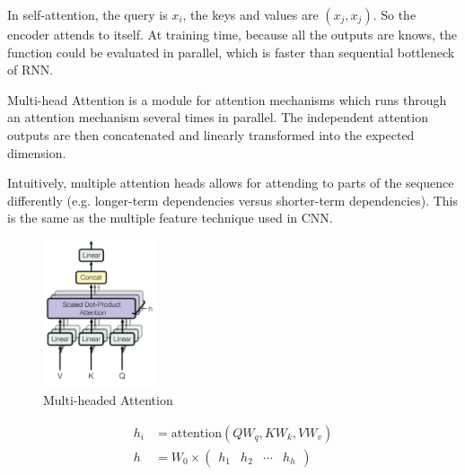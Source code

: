 \begin{definition}
    In self-attention, the query is $x_i$, the keys and values are $(x_j, x_j)$. So the encoder attends to itself. At training time, because all the outputs are knows, the function could be evaluated in parallel, which is faster than sequential bottleneck of RNN.
\end{definition}

\begin{definition}
    Multi-head Attention is a module for attention mechanisms which runs through an attention mechanism several times in parallel. The independent attention outputs are then concatenated and linearly transformed into the expected dimension.
    
    Intuitively, multiple attention heads allows for attending to parts of the sequence differently (e.g. longer-term dependencies versus shorter-term dependencies). This is the same as the multiple feature technique used in CNN.

\begin{figure}[H]
\includegraphics[width=0.3\textwidth]{machine_learning/pic/04/multi-headed-attention.png}
\centering
\caption{Multi-headed Attention}
\end{figure}
\end{definition}

\begin{equation}
    \begin{aligned}
        h_i &= \mathrm{attention}(Q W_q, K W_k, V W_v ) \\
        h &= W_0 \times \begin{pmatrix}
            h_1 & h_2 & \cdots & h_h
        \end{pmatrix}
    \end{aligned}
\end{equation}


